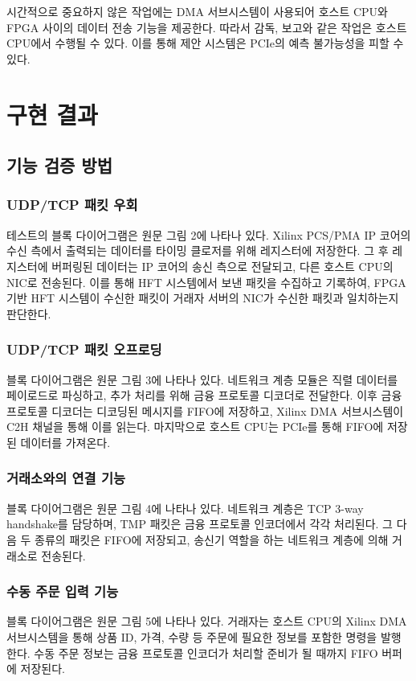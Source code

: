 \documentclass[11pt,a4paper]{article}
\begin{document}
시간적으로 중요하지 않은 작업에는 DMA 서브시스템이 사용되어 호스트 CPU와 FPGA 사이의 데이터 전송 기능을 제공한다. 따라서 감독, 보고와 같은 작업은 호스트 CPU에서 수행될 수 있다. 이를 통해 제안 시스템은 PCIe의 예측 불가능성을 피할 수 있다.

\section{구현 결과}

\subsection{기능 검증 방법}

\subsubsection{UDP/TCP 패킷 우회}
테스트의 블록 다이어그램은 원문 그림 2에 나타나 있다. Xilinx PCS/PMA IP 코어의 수신 측에서 출력되는 데이터를 타이밍 클로저를 위해 레지스터에 저장한다. 그 후 레지스터에 버퍼링된 데이터는 IP 코어의 송신 측으로 전달되고, 다른 호스트 CPU의 NIC로 전송된다. 이를 통해 HFT 시스템에서 보낸 패킷을 수집하고 기록하여, FPGA 기반 HFT 시스템이 수신한 패킷이 거래자 서버의 NIC가 수신한 패킷과 일치하는지 판단한다.

\subsubsection{UDP/TCP 패킷 오프로딩}
블록 다이어그램은 원문 그림 3에 나타나 있다. 네트워크 계층 모듈은 직렬 데이터를 페이로드로 파싱하고, 추가 처리를 위해 금융 프로토콜 디코더로 전달한다. 이후 금융 프로토콜 디코더는 디코딩된 메시지를 FIFO에 저장하고, Xilinx DMA 서브시스템이 C2H 채널을 통해 이를 읽는다. 마지막으로 호스트 CPU는 PCIe를 통해 FIFO에 저장된 데이터를 가져온다.

\subsubsection{거래소와의 연결 기능}
블록 다이어그램은 원문 그림 4에 나타나 있다. 네트워크 계층은 TCP 3-way handshake를 담당하며, TMP 패킷은 금융 프로토콜 인코더에서 각각 처리된다. 그 다음 두 종류의 패킷은 FIFO에 저장되고, 송신기 역할을 하는 네트워크 계층에 의해 거래소로 전송된다.

\subsubsection{수동 주문 입력 기능}
블록 다이어그램은 원문 그림 5에 나타나 있다. 거래자는 호스트 CPU의 Xilinx DMA 서브시스템을 통해 상품 ID, 가격, 수량 등 주문에 필요한 정보를 포함한 명령을 발행한다. 수동 주문 정보는 금융 프로토콜 인코더가 처리할 준비가 될 때까지 FIFO 버퍼에 저장된다.
\end{document}
